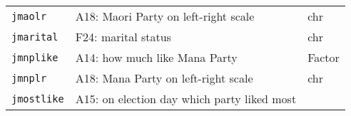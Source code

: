 \documentclass[]{article}
\begin{document}
\begin{longtable}[]{@{}lll@{}}
\begin{minipage}[t]{0.14\columnwidth}\raggedright\strut
\texttt{jmaolr}\strut
\end{minipage} & \begin{minipage}[t]{0.70\columnwidth}\raggedright\strut
A18: Maori Party on left-right scale\strut
\end{minipage} & \begin{minipage}[t]{0.08\columnwidth}\raggedright\strut
chr\strut
\end{minipage}\tabularnewline
\begin{minipage}[t]{0.14\columnwidth}\raggedright\strut
\texttt{jmarital}\strut
\end{minipage} & \begin{minipage}[t]{0.70\columnwidth}\raggedright\strut
F24: marital status\strut
\end{minipage} & \begin{minipage}[t]{0.08\columnwidth}\raggedright\strut
chr\strut
\end{minipage}\tabularnewline
\begin{minipage}[t]{0.14\columnwidth}\raggedright\strut
\texttt{jmnplike}\strut
\end{minipage} & \begin{minipage}[t]{0.70\columnwidth}\raggedright\strut
A14: how much like Mana Party\strut
\end{minipage} & \begin{minipage}[t]{0.08\columnwidth}\raggedright\strut
Factor\strut
\end{minipage}\tabularnewline
\begin{minipage}[t]{0.14\columnwidth}\raggedright\strut
\texttt{jmnplr}\strut
\end{minipage} & \begin{minipage}[t]{0.70\columnwidth}\raggedright\strut
A18: Mana Party on left-right scale\strut
\end{minipage} & \begin{minipage}[t]{0.08\columnwidth}\raggedright\strut
chr\strut
\end{minipage}\tabularnewline
\begin{minipage}[t]{0.14\columnwidth}\raggedright\strut
\texttt{jmostlike}\strut
\end{minipage} & \begin{minipage}[t]{0.70\columnwidth}\raggedright\strut
A15: on election day which party liked most\strut
\end{minipage} & \begin{minipage}[t]{0.08\columnwidth}\raggedright\strut

\end{minipage}
\end{longtable}
\end{document}
